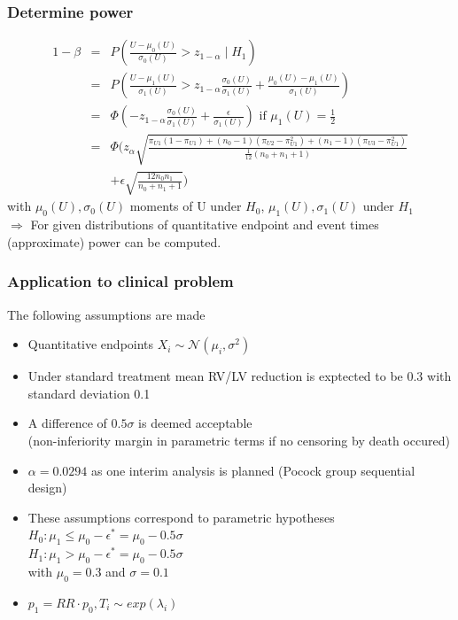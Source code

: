 \documentclass[xcolor=pdftex,dvipsnames,table]{beamer}\usepackage[]{graphicx}\usepackage[]{color}
\begin{document}
\begin{frame}[label = slide9] %
\frametitle{Determine power}
\begin{eqnarray*}
  1 - \beta & = & P(\frac{U - \mu_0(U)}{\sigma_0(U)}  > z_{1-\alpha} \mid H_1) \\
            & = & P \left(\frac{U - \mu_1(U)}{\sigma_1(U)}  > z_{1-\alpha}\frac{\sigma_0(U)}{\sigma_1(U)} + 
                    \frac{\mu_0(U) - \mu_1(U)}{\sigma_1(U)} \right) \\
            & = & \Phi\left(- z_{1-\alpha}\frac{\sigma_0(U)}{\sigma_1(U)} + \frac{\epsilon}{\sigma_1(U)}\right) \mbox{ if } \mu_1(U) = \frac{1}{2}\\
            & = & \Phi\bigg(z_{\alpha} \textstyle \sqrt{\frac{\pi_{U1} (1 - \pi_{U1}) + (n_0 - 1) (\pi_{U2} - \pi_{U1}^2) + (n_1 - 1) (\pi_{U3} - \pi_{U1}^2)}{\frac{1}{12}(n_0 + n_1 + 1)}}  \\
            &   & + \epsilon \textstyle \sqrt{\frac{12 n_0 n_1}{n_0 + n_1 + 1}}
            \bigg)
\end{eqnarray*}
with $\mu_0(U), \sigma_0(U)$ moments of U under $H_0$, $\mu_1(U), \sigma_1(U)$ under $H_1$\\
$\Rightarrow$ 
For given distributions of quantitative endpoint and event times (approximate) power can be computed.
\end{frame}

\begin{frame}[label = slide10] %
\frametitle{Application to clinical problem}
The following assumptions are made
\begin{itemize}
  \item Quantitative endpoints $X_i \sim \mathcal{N} ( \mu_i, \sigma^2 ) $
  \item Under standard treatment mean RV/LV reduction is exptected to be 0.3 with standard deviation 0.1
  \item A difference of $0.5 \sigma$ is deemed acceptable \\
        (non-inferiority margin in parametric terms if no censoring by death occured)
  \item $\alpha = 0.0294$ as one interim analysis is planned (Pocock group sequential design)
  \item These assumptions correspond to parametric hypotheses \\
        $H_0: \mu_1 \leq \mu_0 - \epsilon^{*}  = \mu_0 - 0.5 \sigma $\\
        $H_1: \mu_1 > \mu_0 - \epsilon^{*} = \mu_0 - 0.5 \sigma $ \\
        with $\mu_0 = 0.3$ and $\sigma = 0.1$
  \item $p_1 = RR \cdot p_0 , T_i \sim exp(\lambda_i)$
\end{itemize}
\end{frame}
\end{document}
